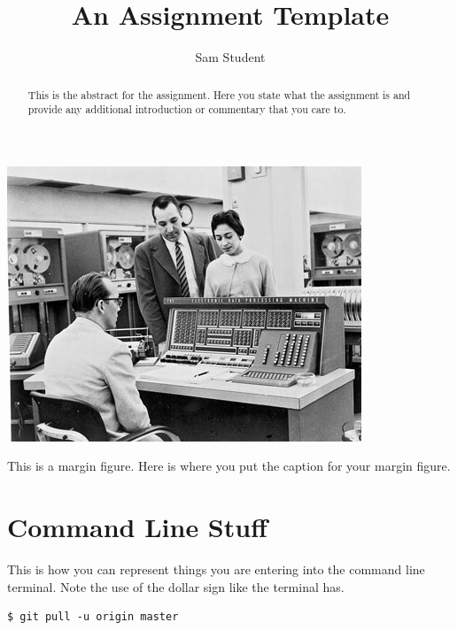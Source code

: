 \documentclass{tufte-handout}
\title{An Assignment Template}
\author[The Academy]{Sam Student}
\begin{document}
\maketitle%
\begin{marginfigure}%
  \includegraphics[width=\linewidth]{IBM.jpg}
  \caption{This is a margin figure.  Here is where you put the caption for your margin figure.}
  \label{fig:marginfig}
\end{marginfigure}
\begin{abstract}
\noindent
This is the abstract for the assignment.  Here you state what the assignment is and provide any additional introduction or commentary that you care to.
\end{abstract}

\normalsize

\vspace{1cm}
\section{Command Line Stuff}

This is how you can represent things you are entering into the command line terminal.  Note the use of the dollar sign like the terminal has.


\begin{shaded}
\begin{verbatim}
$ git pull -u origin master
\end{verbatim}
\end{shaded}
\end{document}
